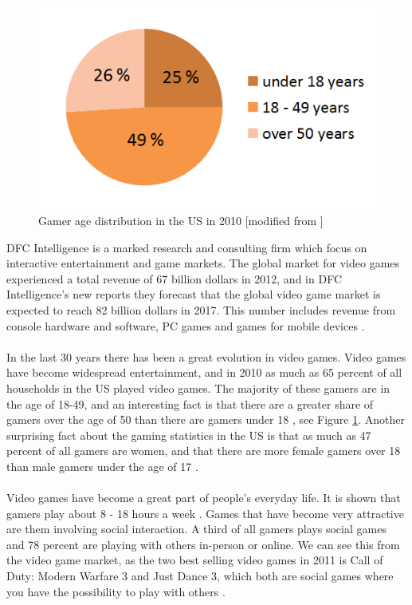 \begin{figure}
\begin{center}
\includegraphics[scale=0.5]{gamersus}
\caption[Gamer age distribution]{Gamer age distribution in the US in 2010 [modified from \cite{statistics2012}]}
\label{fig:GamersUS}
\end{center}
\end{figure}
DFC Intelligence is a marked research and consulting firm which focus on interactive entertainment and game markets. The global market for video games experienced a total revenue of 67 billion dollars in 2012, and in DFC Intelligence's new reports they forecast that the global video game market is expected to reach 82 billion dollars in 2017. This number includes revenue from console hardware and software, PC games and games for mobile devices \cite{videogameforcast} \cite{aboutdfcint}.\\ \\
In the last 30 years there has been a great evolution in video games. Video games have become widespread entertainment, and in 2010 as much as 65 percent of all households in the US played video games. The majority of these gamers are in the age of 18-49, and an interesting fact is that there are a greater share of gamers over the age of 50 than there are gamers under 18 \cite{statistics2010} \cite{statistics2012}, see Figure \ref{fig:GamersUS}. Another surprising fact about the gaming statistics in the US is that as much as 47 percent of all gamers are women, and that there are more female gamers over 18 than male gamers under the age of 17 \cite{statistics2012real}. \\ \\
Video games have become a great part of people's everyday life. It is shown that gamers play about 8 - 18 hours a week \cite{statistics2010} \cite{statistics2012}. Games that have become very attractive are them involving social interaction. A third of all gamers plays social games and 78 percent are playing with others in-person or online. We can see this from the video game market, as the two best selling video games in 2011 is Call of Duty: Modern Warfare 3 and Just Dance 3, which both are social games where you have the possibility to play with others \cite{statistics2012real}. \\ \\ 
